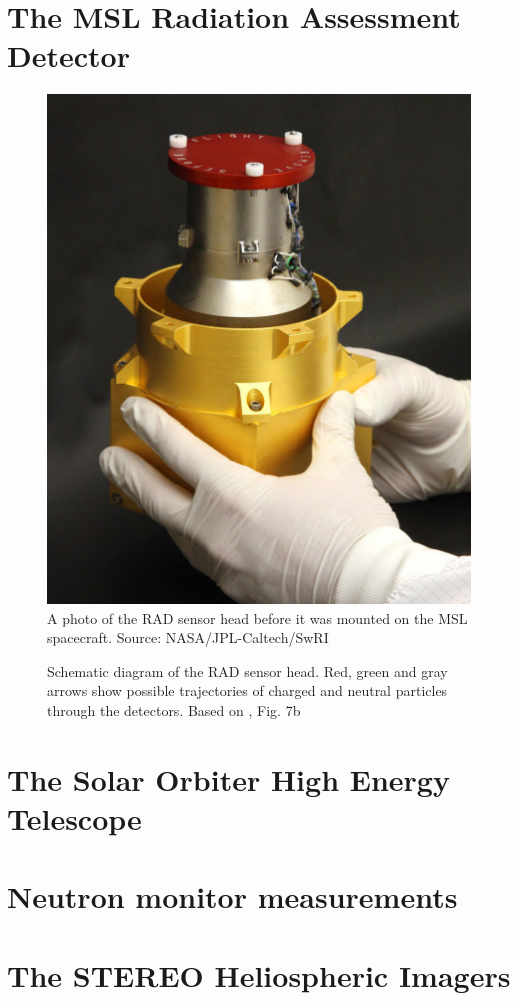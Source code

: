 \section{The MSL Radiation Assessment Detector}
\label{sec:mslrad}

\begin{figure}
    \centering
    \includegraphics[width=0.4\linewidth]{images/rad}
    \caption[Photo of the \acs{RAD} sensor head]{A photo of the \ac{RAD} sensor head before it was mounted on the \ac{MSL} spacecraft. Source: NASA/JPL-Caltech/SwRI}
    \label{subfig:rad-photo}
\end{figure}


\begin{figure}
    \centering
    
    \caption[Schematic diagram of the \acs{RAD} sensor head]{Schematic diagram of the \ac{RAD} sensor head. Red, green and gray arrows show possible trajectories of charged and neutral particles through the detectors. Based on      \textcite{Hassler-2012-MSLRAD}, Fig. 7b}
    \label{fig:rad-sensorhead}
\end{figure}


\section{The Solar Orbiter High Energy Telescope}
\label{sec:solohet}

\section{Neutron monitor measurements}
\label{sec:neutronmonitors}

\section{The STEREO Heliospheric Imagers}
\label{sec:stereohi}

